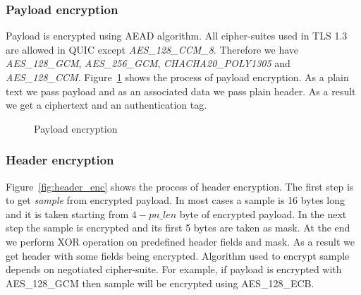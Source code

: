 \subsubsection{Payload encryption}
Payload is encrypted using AEAD algorithm.
All cipher-suites used in TLS 1.3 are allowed in QUIC except \textit{AES\_128\_CCM\_8}.
Therefore we have \textit{AES\_128\_GCM}, \textit{AES\_256\_GCM}, \textit{CHACHA20\_POLY1305} and \textit{AES\_128\_CCM}.
Figure~\ref{fig:payload_enc} shows the process of payload encryption.
As a plain text we pass payload and as an associated data we pass plain header.
As a result we get a ciphertext and an authentication tag.

\begin{figure}[h]
    \centering
    \caption{Payload encryption}
    \label{fig:payload_enc}
\end{figure}

\subsubsection{Header encryption}
Figure~\ref{fig:header_enc} shows the process of header encryption.
The first step is to get \textit{sample} from encrypted payload.
In most cases a sample is 16 bytes long and it is taken starting from $4 - pn\_len$ byte of encrypted payload.
In the next step the sample is encrypted and its first 5 bytes are taken as mask.
At the end we perform XOR operation on predefined header fields and mask.
As a result we get header with some fields being encrypted.
Algorithm used to encrypt sample depends on negotiated cipher-suite.
For example, if payload is encrypted with AES\_128\_GCM then sample will be encrypted using AES\_128\_ECB.

